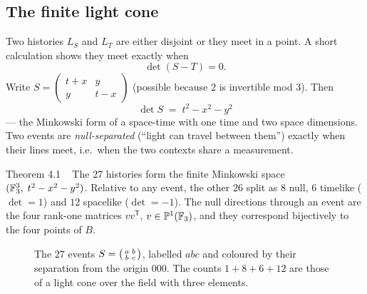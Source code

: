 \subsection{The finite light cone}

Two histories $L_S$ and $L_T$ are either disjoint or they meet in a point. A short
calculation shows they meet exactly when
\[
\det(S-T)=0 .
\]
Write $S=\begin{pmatrix} t+x & y\\ y & t-x\end{pmatrix}$ (possible because $2$ is
invertible mod $3$). Then
\[
\boxed{\;\det S \;=\; t^2-x^2-y^2\;}
\]
--- the Minkowski form of a space-time with one time and two space dimensions. Two events
are \emph{null-separated} (``light can travel between them'') exactly when their lines
meet, i.e.\ when the two contexts share a measurement.

\begin{result}{Theorem 4.1 \hfill \tierT\ \tierC}
The $27$ histories form the finite Minkowski space $(\mathbb{F}_3^3,\;t^2-x^2-y^2)$. Relative to any
event, the other $26$ split as $8$ null, $6$ timelike ($\det=1$) and $12$ spacelike
($\det=-1$). The null directions through an event are the four rank-one matrices
$vv^{\mathsf T}$, $v\in\mathbb{P}^1(\mathbb{F}_3)$, and they correspond bijectively to the four
points of $B$.
\end{result}

\begin{figure}[htbp]
\centering
{}
\caption{The $27$ events $S=\begin{psmallmatrix}a&b\\b&c\end{psmallmatrix}$, labelled
$abc$ and coloured by their separation from the origin $000$. The counts
$1+8+6+12$ are those of a light cone over the field with three elements.}
\label{fig:mink27}
\end{figure}

